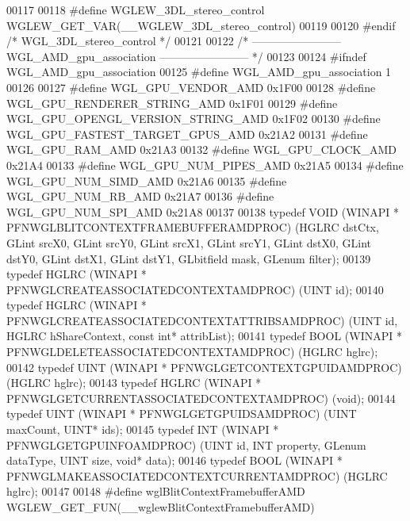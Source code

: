 \begin{DoxyCode}
00117 
00118 \textcolor{preprocessor}{#define WGLEW\_3DL\_stereo\_control WGLEW\_GET\_VAR(\_\_WGLEW\_3DL\_stereo\_control)}
00119 
00120 \textcolor{preprocessor}{#endif }\textcolor{comment}{/* WGL\_3DL\_stereo\_control */}\textcolor{preprocessor}{}
00121 
00122 \textcolor{comment}{/* ------------------------ WGL\_AMD\_gpu\_association ------------------------ */}
00123 
00124 \textcolor{preprocessor}{#ifndef WGL\_AMD\_gpu\_association}
00125 \textcolor{preprocessor}{#define WGL\_AMD\_gpu\_association 1}
00126 
00127 \textcolor{preprocessor}{#define WGL\_GPU\_VENDOR\_AMD 0x1F00}
00128 \textcolor{preprocessor}{#define WGL\_GPU\_RENDERER\_STRING\_AMD 0x1F01}
00129 \textcolor{preprocessor}{#define WGL\_GPU\_OPENGL\_VERSION\_STRING\_AMD 0x1F02}
00130 \textcolor{preprocessor}{#define WGL\_GPU\_FASTEST\_TARGET\_GPUS\_AMD 0x21A2}
00131 \textcolor{preprocessor}{#define WGL\_GPU\_RAM\_AMD 0x21A3}
00132 \textcolor{preprocessor}{#define WGL\_GPU\_CLOCK\_AMD 0x21A4}
00133 \textcolor{preprocessor}{#define WGL\_GPU\_NUM\_PIPES\_AMD 0x21A5}
00134 \textcolor{preprocessor}{#define WGL\_GPU\_NUM\_SIMD\_AMD 0x21A6}
00135 \textcolor{preprocessor}{#define WGL\_GPU\_NUM\_RB\_AMD 0x21A7}
00136 \textcolor{preprocessor}{#define WGL\_GPU\_NUM\_SPI\_AMD 0x21A8}
00137 
00138 \textcolor{keyword}{typedef} VOID (WINAPI * PFNWGLBLITCONTEXTFRAMEBUFFERAMDPROC) (HGLRC dstCtx, GLint 
      srcX0, GLint srcY0, GLint srcX1, GLint srcY1, GLint dstX0, GLint dstY0, GLint 
      dstX1, GLint dstY1, GLbitfield mask, GLenum filter);
00139 \textcolor{keyword}{typedef} HGLRC (WINAPI * PFNWGLCREATEASSOCIATEDCONTEXTAMDPROC) (UINT id);
00140 \textcolor{keyword}{typedef} HGLRC (WINAPI * PFNWGLCREATEASSOCIATEDCONTEXTATTRIBSAMDPROC) (UINT id, 
      HGLRC hShareContext, \textcolor{keyword}{const} \textcolor{keywordtype}{int}* attribList);
00141 \textcolor{keyword}{typedef} BOOL (WINAPI * PFNWGLDELETEASSOCIATEDCONTEXTAMDPROC) (HGLRC hglrc);
00142 \textcolor{keyword}{typedef} UINT (WINAPI * PFNWGLGETCONTEXTGPUIDAMDPROC) (HGLRC hglrc);
00143 \textcolor{keyword}{typedef} HGLRC (WINAPI * PFNWGLGETCURRENTASSOCIATEDCONTEXTAMDPROC) (void);
00144 \textcolor{keyword}{typedef} UINT (WINAPI * PFNWGLGETGPUIDSAMDPROC) (UINT maxCount, UINT* ids);
00145 \textcolor{keyword}{typedef} INT (WINAPI * PFNWGLGETGPUINFOAMDPROC) (UINT id, INT property, GLenum 
      dataType, UINT size, \textcolor{keywordtype}{void}* data);
00146 \textcolor{keyword}{typedef} BOOL (WINAPI * PFNWGLMAKEASSOCIATEDCONTEXTCURRENTAMDPROC) (HGLRC hglrc);
00147 
00148 \textcolor{preprocessor}{#define wglBlitContextFramebufferAMD WGLEW\_GET\_FUN(\_\_wglewBlitContextFramebufferAMD)}

\end{DoxyCode}

